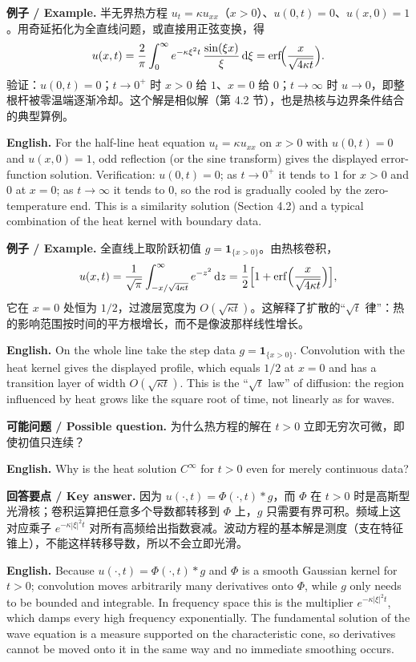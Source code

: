 \documentclass[UTF8,11pt,a4paper]{ctexart}
\newcommand{\EN}[1]{\par\noindent \textbf{English.} #1\par}
\newcommand{\EX}[2]{\par\noindent \textbf{例子 / Example.} #1\par\EN{#2}}
\newcommand{\ASK}[4]{\par\noindent \textbf{可能问题 / Possible question.} #1\par\EN{#2}\noindent \textbf{回答要点 / Key answer.} #3\par\EN{#4}\medskip}
\newcommand{\dd}{\mathrm{d}}
\begin{document}
\EX{半无界热方程 $u_t=\kappa u_{xx}$（$x>0$）、$u(0,t)=0$、$u(x,0)=1$。用奇延拓化为全直线问题，或直接用正弦变换，得
\[
u(x,t)=\frac{2}{\pi}\int_0^\infty e^{-\kappa\xi^2t}\,\frac{\sin(\xi x)}{\xi}\,\dd\xi
=\operatorname{erf}\!\Bigl(\frac{x}{\sqrt{4\kappa t}}\Bigr).
\]
验证：$u(0,t)=0$；$t\to0^+$ 时 $x>0$ 给 $1$、$x=0$ 给 $0$；$t\to\infty$ 时 $u\to0$，即整根杆被零温端逐渐冷却。这个解是相似解（第 4.2 节），也是热核与边界条件结合的典型算例。}{For the half-line heat equation $u_t=\kappa u_{xx}$ on $x>0$ with $u(0,t)=0$ and $u(x,0)=1$, odd reflection (or the sine transform) gives the displayed error-function solution. Verification: $u(0,t)=0$; as $t\to0^+$ it tends to $1$ for $x>0$ and $0$ at $x=0$; as $t\to\infty$ it tends to $0$, so the rod is gradually cooled by the zero-temperature end. This is a similarity solution (Section 4.2) and a typical combination of the heat kernel with boundary data.}

\EX{全直线上取阶跃初值 $g=\mathbf 1_{\{x>0\}}$。由热核卷积，
\[
u(x,t)=\frac{1}{\sqrt{\pi}}\int_{-x/\sqrt{4\kappa t}}^{\infty}e^{-z^2}\,\dd z
=\frac12\Bigl[1+\operatorname{erf}\Bigl(\frac{x}{\sqrt{4\kappa t}}\Bigr)\Bigr],
\]
它在 $x=0$ 处恒为 $1/2$，过渡层宽度为 $O(\sqrt{\kappa t})$。这解释了扩散的``$\sqrt t$ 律''：热的影响范围按时间的平方根增长，而不是像波那样线性增长。}{On the whole line take the step data $g=\mathbf 1_{\{x>0\}}$. Convolution with the heat kernel gives the displayed profile, which equals $1/2$ at $x=0$ and has a transition layer of width $O(\sqrt{\kappa t})$. This is the ``$\sqrt t$ law'' of diffusion: the region influenced by heat grows like the square root of time, not linearly as for waves.}

\ASK{为什么热方程的解在 $t>0$ 立即无穷次可微，即使初值只连续？}{Why is the heat solution $C^\infty$ for $t>0$ even for merely continuous data?}{因为 $u(\cdot,t)=\Phi(\cdot,t)*g$，而 $\Phi$ 在 $t>0$ 时是高斯型光滑核；卷积运算把任意多个导数都转移到 $\Phi$ 上，$g$ 只需要有界可积。频域上这对应乘子 $e^{-\kappa|\xi|^2t}$ 对所有高频给出指数衰减。波动方程的基本解是测度（支在特征锥上），不能这样转移导数，所以不会立即光滑。}{Because $u(\cdot,t)=\Phi(\cdot,t)*g$ and $\Phi$ is a smooth Gaussian kernel for $t>0$; convolution moves arbitrarily many derivatives onto $\Phi$, while $g$ only needs to be bounded and integrable. In frequency space this is the multiplier $e^{-\kappa|\xi|^2t}$, which damps every high frequency exponentially. The fundamental solution of the wave equation is a measure supported on the characteristic cone, so derivatives cannot be moved onto it in the same way and no immediate smoothing occurs.}
\end{document}
